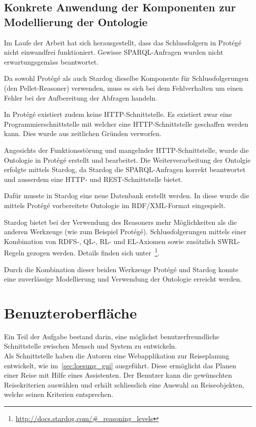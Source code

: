\subsection{Konkrete Anwendung der Komponenten zur Modellierung der Ontologie}
\label{subsec:komponenten_anwendung}
Im Laufe der Arbeit hat sich herausgestellt, dass das Schlussfolgern in Protégé nicht einwandfrei funktioniert. Gewisse SPARQL-Anfragen wurden nicht erwartungsgemäss beantwortet.

Da sowohl Protégé als auch Stardog dieselbe Komponente für Schlussfolgerungen (den Pellet-Reasoner) verwenden, muss es sich bei dem Fehlverhalten um einen Fehler bei der Aufbereitung der Abfragen handeln.

In Protégé existiert zudem keine HTTP-Schnittstelle. Es existiert zwar eine Programmierschnittstelle mit welcher eine HTTP-Schnittstelle geschaffen werden kann. Dies wurde aus zeitlichen Gründen verworfen.

Angesichts der Funktionsstörung und mangelnder HTTP-Schnittstelle, wurde die Ontologie in Protégé erstellt und bearbeitet. Die Weiterverarbeitung der Ontolgie erfolgte mittels Stardog, da Stardog die SPARQL-Anfragen korrekt beantwortet und ausserdem eine HTTP- und REST-Schnittstelle bietet.

Dafür musste in Stardog eine neue Datenbank erstellt werden. In diese wurde die mittels Protégé vorbereitete Ontologie im RDF/XML-Format eingespielt.

Stardog bietet bei der Verwendung des Reasoners mehr Möglichkeiten als die anderen Werkzeuge (wie zum Beispiel Protégé). Schlussfolgerungen mittels einer Kombination von RDFS-, QL-, RL- und EL-Axiomen sowie zusätzlich SWRL-Regeln gezogen werden. Details finden sich unter~\footnote{\url{http://docs.stardog.com/\#_reasoning_levels}}.


Durch die Kombination dieser beiden Werkzeuge Protégé und Stardog konnte eine zuverlässige Modellierung und Verwendung der Ontologie erreicht werden.

\section{Benuzteroberfläche}
\label{sec:komponenten:ember}
Ein Teil der Aufgabe bestand darin, eine möglichst benutzerfreundliche Schnittstelle zwischen Mensch und System zu entwickeln.\\
Als Schnittstelle haben die Autoren eine Webapplikation zur Reiseplanung entwickelt, wie im~\autoref{sec:loesung_gui} ausgeführt. Diese ermöglicht das Planen einer Reise mit Hilfe eines Assistenten. Der Benutzer kann die gewünschten Reisekriterien auswählen und erhält schliesslich eine Auswahl an Reiseobjekten, welche seinen Kriterien entsprechen.


